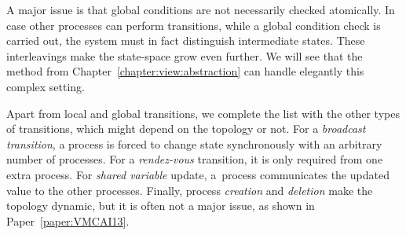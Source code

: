 %
%
A major issue %
is that global conditions are not necessarily checked atomically. %
% 
In case other processes can perform transitions, while a global
condition check is carried out, the system must in fact distinguish
intermediate states.
%
%
These interleavings make the state-space grow even further.
%
We will see that the method from
Chapter~\ref{chapter:view:abstraction} %
can handle elegantly this complex setting.

%
%
Apart from local and global transitions,
%
we complete the list with the other types of transitions, which might
depend on the topology or not.
% 
%
%
%
For a \emph{broadcast transition}, a process is forced to change state
synchronously with an arbitrary number of processes.
%
For a \emph{rendez-vous} transition, it is only required from one
extra process. %
%
%
For \emph{shared variable} update, a~process communicates the updated
value to the other processes.
%
%
Finally, process \emph{creation} and \emph{deletion} make the topology
dynamic, but it is often not a major issue, %
as shown in Paper~\ref{paper:VMCAI13}.
